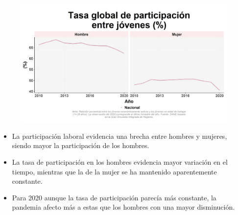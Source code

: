     \begin{figure}[H]
        \caption[Tasa global de participación entre jóvenes por género ]{\label{particjov_gen_trend} }
        \begin{center}
        \includegraphics[width=\textwidth,keepaspectratio]{img/var_85_trend.png}
        \end{center}
    \end{figure}
            \begin{itemize}
                \item La participación laboral evidencia una brecha entre hombres y mujeres, siendo mayor la participación de los hombres.
                \item La tasa de participación en los hombres evidencia mayor variación en el tiempo, mientras que la de la mujer se ha mantenido aparentemente constante.
                \item Para 2020 aunque la tasa de participación parecía más constante, la pandemia afecto más a estas que los hombres con una mayor disminución.
                \end{itemize}

